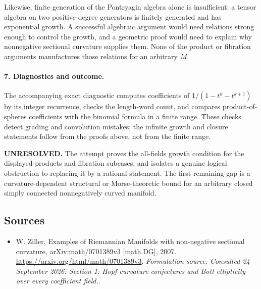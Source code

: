 \documentclass[11pt]{article}
\begin{document}
Likewise, finite generation of the Pontryagin algebra alone is insufficient: a tensor algebra on two positive-degree generators is finitely generated and has exponential growth. A successful algebraic argument would need relations strong enough to control the growth, and a geometric proof would need to explain why nonnegative sectional curvature supplies them. None of the product or fibration arguments manufactures those relations for an arbitrary $M$.

\paragraph{7. Diagnostics and outcome.}
The accompanying exact diagnostic computes coefficients of $1/(1-t^k-t^{k+1})$ by its integer recurrence, checks the length-word count, and compares product-of-spheres coefficients with the binomial formula in a finite range. These checks detect grading and convolution mistakes; the infinite growth and closure statements follow from the proofs above, not from the finite range.

\textbf{UNRESOLVED.} The attempt proves the all-fields growth condition for the displayed products and fibration subcases, and isolates a genuine logical obstruction to replacing it by a rational statement. The first remaining gap is a curvature-dependent structural or Morse-theoretic bound for an arbitrary closed simply connected nonnegatively curved manifold.

\subsection{Sources}
\begin{itemize}
\item[S1]W. Ziller, Examples of Riemannian Manifolds with non-negative sectional curvature, arXiv:math/0701389v3 [math.DG], 2007.
\url{https://arxiv.org/html/math/0701389v3}.
\textit{Formulation source. Consulted 24 September 2026: Section 1: Hopf curvature conjectures and Bott ellipticity over every coefficient field..}
\end{itemize}
\end{document}
